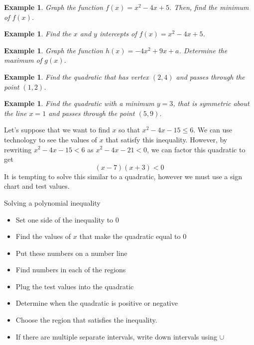 \documentclass[twoside]{tufte-handout}
\newcounter{ekcounter}%
\theoremstyle{ekimcustom}
\newtheorem{exm}[ekcounter]{Example}
\begin{document}
\begin{exm}{}Graph the function $f(x)=x^2-4x+5$. Then, find the minimum of $f(x)$. 
\end{exm}\vskip10pt


\everymath{\displaystyle}
\begin{exm}{}Find the $x$ and $y$ intercepts of  $f(x)=x^2-4x+5$.
\end{exm}\vskip10pt

\begin{exm}{}Graph the function $h(x)=-4x^2+9x+a$. Determine the maximum of $g(x)$.
\end{exm}\vskip10pt

\everymath{\displaystyle}
\begin{exm}{}Find the quadratic that has vertex $(2,4)$ and passes through the point $(1,2)$.
\end{exm}\vskip10pt

\everymath{\displaystyle}
\begin{exm}{}Find the quadratic with a minimum $y=3$, that is symmetric about the line $x=1$ and passes through the point $(5, 9)$.
\end{exm}\vskip10pt

Let's suppose that we want to find $x$ so that $x^2-4x-15\leq6$. We can use technology to see the values of $x$ that satisfy this inequality. However, by rewriting $x^2-4x-15<6$ as $x^2-4x-21<0$, we can factor this quadratic to get  $$(x-7)(x+3)<0$$
It is tempting to solve this similar to a quadratic, however we must use a sign chart and test values. 

\begin{bmethod}{Solving a polynomial inequality}{}
\begin{itemize}
\item Set one side of the inequality to $0$  
\item  Find the values of $x$ that make the quadratic equal to $0$   
		\item  Put these numbers on a number line 
	\item Find numbers in each of the regions
\item  Plug the test values into the quadratic  
\item      Determine when the quadratic is positive or negative 
\item      Choose the region that satisfies the inequality.
\item If there are multiple separate intervals, write down intervals using $\cup$
\end{itemize}
\end{bmethod}
\end{document}
